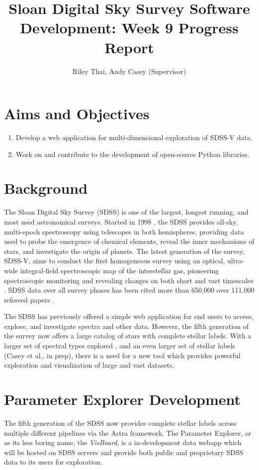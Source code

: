 \documentclass[a4paper,10pt,twocolumn]{article}
\title{Sloan Digital Sky Survey Software Development: Week 9 Progress Report}
\author{Riley Thai, Andy Casey (Supervisor)}
\begin{document}
\maketitle
\section{Aims and Objectives}
\begin{enumerate}
	\item Develop a web application for multi-dimensional exploration of SDSS-V data.
	\item Work on and contribute to the development of open-source Python libraries.
\end{enumerate}

\section{Background}
The Sloan Digital Sky Survey (SDSS) is one of the largest, longest running, and most used astronomical surveys. Started in 1998 \parencite{dr18}, the SDSS provides all-sky, multi-epoch spectroscopy using telescopes in both hemispheres, providing data used to probe the emergence of chemical elements, reveal the inner mechanisms of stars, and investigate the origin of planets. The latest generation of the survey, SDSS-V, aims to conduct the first homogeneous survey using an optical, ultra-wide integral-field spectroscopic map of the interstellar gas, pioneering spectroscopic monitoring and revealing changes on both short and vast timescales \parencite{SDSS2017}. SDSS data over all survey phases has been cited more than 650,000 over 111,000 refereed papers \parencite{dr18}.

The SDSS has previously offered a simple web application for end users to access, explore, and investigate spectra and other data. However, the fifth generation of the survey now offers a large catalog of stars with complete stellar labels. With a larger set of spectral types explored \parencite{apogee2017}, and an even larger set of stellar labels (Casey et al., in prep), there is a need for a new tool which provides powerful exploration and visualization of large and vast datasets.

\section{Parameter Explorer Development}
The fifth generation of the SDSS now provides complete stellar labels across multiple different pipelines via the Astra framework. The Parameter Explorer, or as its less boring name, the \emph{VisBoard}, is a in-development data webapp which will be hosted on SDSS servers and provide both public and proprietary SDSS data to its users for exploration.
\end{document}
